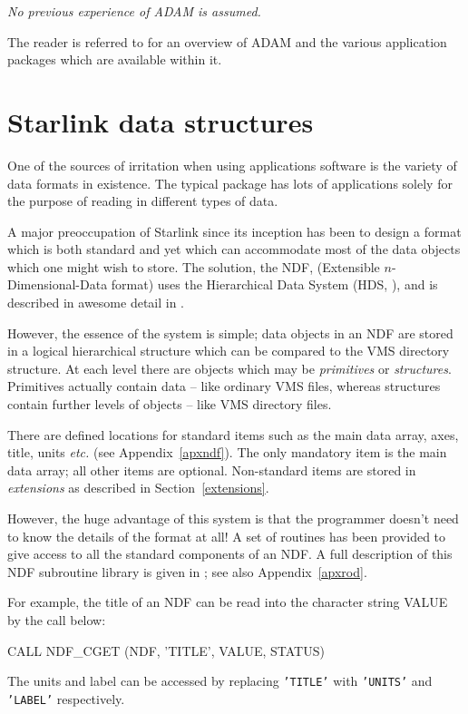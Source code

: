 \documentclass[twoside,11pt,nolof]{starlink}
\begin{document}
{\sl No previous experience of ADAM is assumed.}

The reader is referred to  for an overview of ADAM and the
various application packages which are available within it.

\newpage
\section{Starlink data structures\label{ndf}}

One of the sources of irritation when using applications software is the
variety of data formats in existence.
The typical package has lots of applications solely for the
purpose of reading in different types of data.

A major preoccupation of Starlink since its inception has been to
design a format which
is both standard and yet which can accommodate most of the
data objects which one might wish to store.
The solution,  the NDF, (Extensible $n$-Dimensional-Data format) uses
the Hierarchical Data System (HDS, ), and is described
in awesome detail in .

However, the essence of the system is simple; data objects in an NDF
are stored in a
logical hierarchical structure which can be compared to the VMS
directory structure.
At each level there are objects which may be {\sl primitives\/}
or {\sl structures}.
Primitives actually contain data -- like ordinary VMS files, whereas
structures contain further levels of objects -- like VMS directory files.

There are defined locations for standard items such as the main data array,
axes, title, units \textit{etc.} (see Appendix~\ref{apxndf}).
The only mandatory item is the main data
array; all other items are optional.
Non-standard items are stored in {\sl extensions\/}
as described in Section~\ref{extensions}.

However, the huge advantage of this system is that the programmer
doesn't need to know the details of the
format at all!
A set of routines has been provided to give access
to all the standard components of an NDF.
A full description of this NDF subroutine library is given in
;
see also Appendix~\ref{apxrod}.


For example, the title of an NDF can be read into the character string
VALUE by the call below:
\begin{terminalv}
      CALL NDF_CGET (NDF, 'TITLE', VALUE, STATUS)
\end{terminalv}
The units and label can be accessed by replacing
\texttt{'TITLE'} with \texttt{'UNITS'} and \texttt{'LABEL'} respectively.
\end{document}
